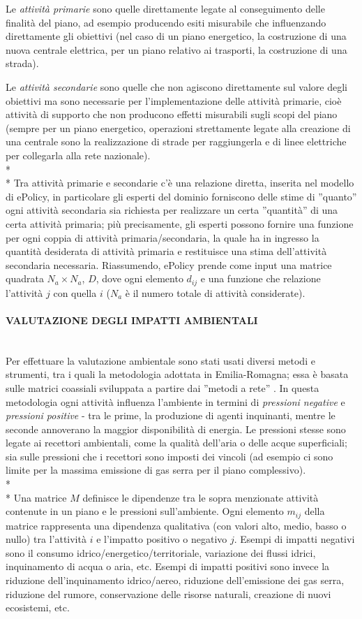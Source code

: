 \documentclass[12pt,a4paper,openright,twoside]{report}
\newcommand{\myparagraph}[1]{\paragraph{#1}\mbox{}\\}
\begin{document}
Le \emph{attività primarie} sono quelle direttamente legate al conseguimento delle finalità del piano, ad esempio producendo esiti misurabile che influenzando direttamente gli obiettivi (nel caso di un piano energetico, la costruzione di una nuova centrale elettrica, per un piano relativo ai trasporti, la costruzione di una strada).

Le \emph{attività secondarie} sono quelle che non agiscono direttamente sul valore degli obiettivi ma sono necessarie per l'implementazione delle attività primarie, cioè attività di supporto che non producono effetti misurabili sugli scopi del piano (sempre per un piano energetico, operazioni strettamente legate alla creazione di una centrale sono la realizzazione di strade per raggiungerla e di linee elettriche per collegarla alla rete nazionale).\\*\\*
Tra attività primarie e secondarie c'è una relazione diretta, inserita nel modello di ePolicy, in particolare gli esperti del dominio forniscono delle stime di ''quanto'' ogni attività secondaria sia richiesta per realizzare un  certa ''quantità'' di una certa attività primaria; più precisamente, gli esperti possono fornire una funzione per ogni coppia di attività primaria/secondaria, la quale ha in ingresso la quantità desiderata di attività primaria e restituisce una stima dell'attività secondaria necessaria. Riassumendo, ePolicy prende come input una matrice quadrata $N_a \times N_a$, $D$, dove ogni elemento $d_{ij}$ e una funzione che relazione l'attività $j$ con quella $i$ ($N_a$ è il numero totale di attività considerate).

\myparagraph{VALUTAZIONE DEGLI IMPATTI AMBIENTALI}
Per effettuare la valutazione ambientale sono stati usati diversi metodi e strumenti, tra i quali la metodologia adottata in Emilia-Romagna; essa è basata sulle matrici coassiali \cite{coaxMatr} sviluppata a partire dai ''metodi a rete'' \cite{networkMethod}. In questa metodologia ogni attività influenza l'ambiente  in termini di \emph{pressioni negative} e \emph{pressioni positive} - tra le prime, la produzione di agenti inquinanti, mentre le seconde annoverano la maggior disponibilità di energia. Le pressioni stesse sono legate ai recettori ambientali, come la qualità dell'aria o delle acque superficiali; sia sulle pressioni che i recettori sono imposti dei vincoli (ad esempio ci sono limite per la massima emissione di gas serra per il piano complessivo).\\*\\*
Una matrice $M$ definisce le dipendenze tra le sopra menzionate attività contenute in un piano e le pressioni sull'ambiente. Ogni elemento $m_{ij}$ della matrice rappresenta una dipendenza qualitativa (con valori alto, medio, basso o nullo) tra l'attività $i$ e l'impatto positivo o negativo $j$. Esempi di impatti negativi sono il consumo idrico/energetico/territoriale, variazione dei flussi idrici, inquinamento di acqua o aria, etc. Esempi di impatti positivi sono invece la riduzione dell'inquinamento idrico/aereo, riduzione dell'emissione dei gas serra, riduzione del rumore, conservazione delle risorse naturali, creazione di nuovi ecosistemi, etc.
\end{document}
